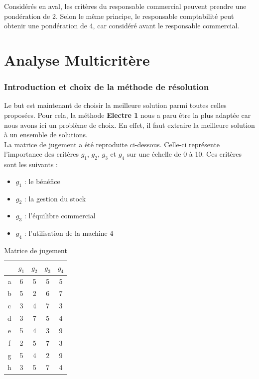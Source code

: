 \documentclass[paper=a4, fontsize=11pt]{report}
\numberwithin{equation}{section}		%
\numberwithin{figure}{section}			%
\numberwithin{table}{section}				%
\begin{document}
Considérés en aval, les critères du responsable commercial peuvent prendre une pondération de 2. Selon le même principe, le responsable comptabilité peut obtenir une pondération de 4, car considéré avant le responsable commercial.


\part{Analyse Multicritère}
\setcounter{section}{0}


\section{Introduction et choix de la méthode de résolution}
Le but est maintenant de choisir la meilleure solution parmi toutes celles proposées. Pour cela, la méthode \textbf{Electre 1} nous a paru être la plus adaptée car nous avons ici un problème de choix. En effet, il faut extraire la meilleure solution à un ensemble de solutions.\\

La matrice de jugement a été reproduite ci-dessous. Celle-ci représente l'importance des critères $g_1$, $g_2$, $g_3$ et $g_4$ sur une échelle de 0 à 10. Ces critères sont les suivants : 

\begin{multicols}{2}

\begin{itemize}
\item $g_1$ : le bénéfice
\item $g_2$ : la gestion du stock
\item $g_3$ : l'équilibre commercial
\item $g_4$ : l'utilisation de la machine 4
\end{itemize}


\begin{table}[H]
\begin{center}
\begin{tabular}{c|cccc}
 & $g_1$ & $g_2$ & $g_3$ & $g_4$ \\ 
\hline 
a & 6 & 5 & 5 & 5 \\ 
b & 5 & 2 & 6 & 7 \\ 
c & 3 & 4 & 7 & 3 \\ 
d & 3 & 7 & 5 & 4 \\ 
e & 5 & 4 & 3 & 9 \\ 
f & 2 & 5 & 7 & 3 \\ 
g & 5 & 4 & 2 & 9 \\ 
h & 3 & 5 & 7 & 4 \\ 
\end{tabular}
\caption{Matrice de jugement} 
\end{center}
\end{table}

\end{multicols}
\end{document}
